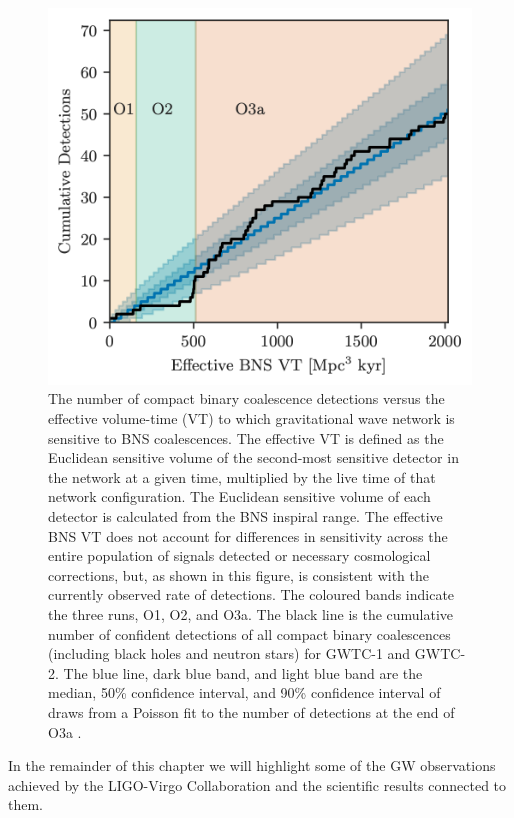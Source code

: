 \documentclass[binding=0.6cm, LaM]{sapthesis}
\begin{document}
        \begin{figure}[!t]
          \label{o3detection}
          \includegraphics[scale=0.22]{o3detection}
          \centering
          \caption{The number of compact binary coalescence detections versus the effective volume-time (VT) to which gravitational wave network is sensitive to BNS coalescences. The effective VT is defined as the Euclidean sensitive volume of the second-most sensitive detector in the network at a given time, multiplied by the live time of that network configuration. The Euclidean sensitive volume of each detector is calculated from the BNS inspiral range. The effective BNS VT does not account for differences in sensitivity across the entire population of signals detected or necessary cosmological corrections, but, as shown in this figure, is consistent with the currently observed rate of detections. The coloured bands indicate the three runs, O1, O2, and O3a. The black line is the cumulative number of confident detections of all compact binary coalescences (including black holes and neutron stars) for GWTC-1 and GWTC-2. The blue line, dark blue band, and light blue band are the median, 50\% confidence interval, and 90\% confidence interval of draws from a Poisson fit to the number of detections at the end of O3a \cite{49}.}
          \label{fig:o3detection}
        \end{figure}

        In the remainder of this chapter we will highlight some of the GW observations achieved 
	by the LIGO-Virgo Collaboration and the scientific results connected to them.
\end{document}
